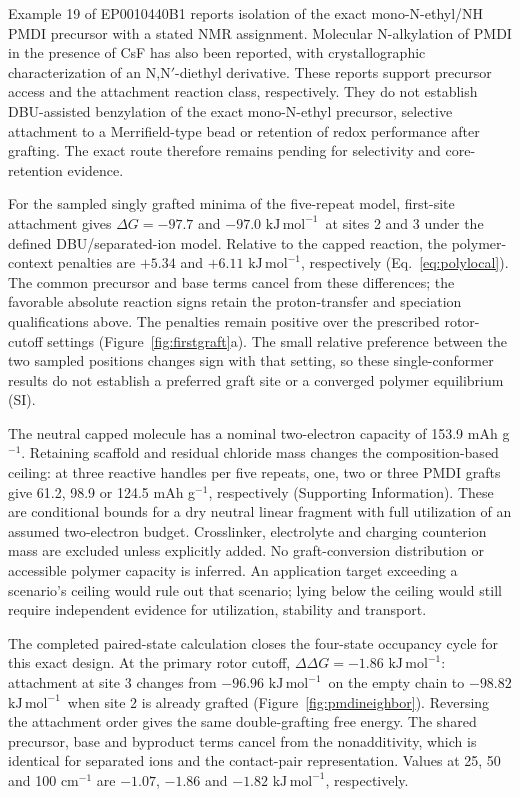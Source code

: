 \documentclass[11pt]{article}
\newcommand{\kj}{\ensuremath{\mathrm{kJ\,mol^{-1}}}}
\begin{document}
Example 19 of EP0010440B1 reports isolation of the exact mono-N-ethyl/NH PMDI precursor with a stated NMR assignment.\cite{bochis1983} Molecular N-alkylation of PMDI in the presence of CsF has also been reported, with crystallographic characterization of an N,N$'$-diethyl derivative.\cite{hamilton1998} These reports support precursor access and the attachment reaction class, respectively. They do not establish DBU-assisted benzylation of the exact mono-N-ethyl precursor, selective attachment to a Merrifield-type bead or retention of redox performance after grafting. The exact route therefore remains pending for selectivity and core-retention evidence.

For the sampled singly grafted minima of the five-repeat model, first-site attachment gives $\Delta G=-97.7$ and $-97.0$ \kj\ at sites 2 and 3 under the defined DBU/separated-ion model. Relative to the capped reaction, the polymer-context penalties are $+5.34$ and $+6.11$ \kj, respectively (Eq.~\ref{eq:polylocal}). The common precursor and base terms cancel from these differences; the favorable absolute reaction signs retain the proton-transfer and speciation qualifications above. The penalties remain positive over the prescribed rotor-cutoff settings (Figure~\ref{fig:firstgraft}a). The small relative preference between the two sampled positions changes sign with that setting, so these single-conformer results do not establish a preferred graft site or a converged polymer equilibrium (SI).

The neutral capped molecule has a nominal two-electron capacity of 153.9 mAh g$^{-1}$. Retaining scaffold and residual chloride mass changes the composition-based ceiling: at three reactive handles per five repeats, one, two or three PMDI grafts give 61.2, 98.9 or 124.5 mAh g$^{-1}$, respectively (Supporting Information). These are conditional bounds for a dry neutral linear fragment with full utilization of an assumed two-electron budget. Crosslinker, electrolyte and charging counterion mass are excluded unless explicitly added. No graft-conversion distribution or accessible polymer capacity is inferred. An application target exceeding a scenario's ceiling would rule out that scenario; lying below the ceiling would still require independent evidence for utilization, stability and transport.

The completed paired-state calculation closes the four-state occupancy cycle for this exact design. At the primary rotor cutoff, $\Delta\Delta G=-1.86$ \kj: attachment at site 3 changes from $-96.96$ \kj\ on the empty chain to $-98.82$ \kj\ when site 2 is already grafted (Figure~\ref{fig:pmdineighbor}). Reversing the attachment order gives the same double-grafting free energy. The shared precursor, base and byproduct terms cancel from the nonadditivity, which is identical for separated ions and the contact-pair representation. Values at 25, 50 and 100 cm$^{-1}$ are $-1.07$, $-1.86$ and $-1.82$ \kj, respectively.
\end{document}
